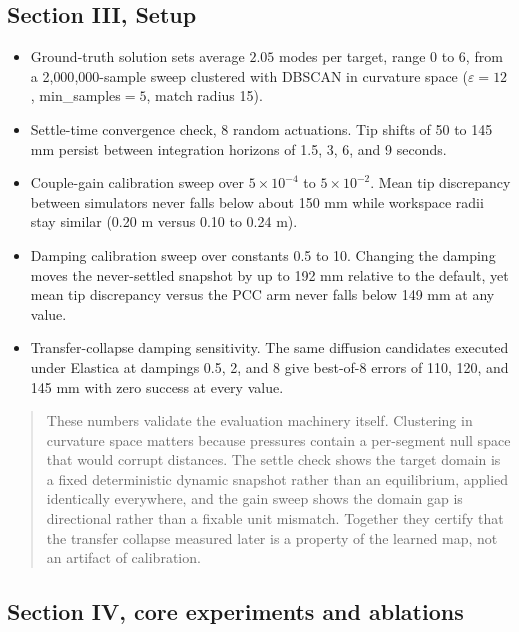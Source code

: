 \documentclass[11pt]{article}
\newcommand{\desc}[1]{\begin{quote}\small #1\end{quote}}
\begin{document}
\subsection*{Section III, Setup}

\begin{itemize}
\item Ground-truth solution sets average $2.05$ modes per target, range 0 to
6, from a 2{,}000{,}000-sample sweep clustered with DBSCAN in curvature
space ($\varepsilon{=}12$, min\_samples${}=5$, match radius 15).
\item Settle-time convergence check, 8 random actuations. Tip shifts of 50
to 145 mm persist between integration horizons of 1.5, 3, 6, and 9 seconds.
\item Couple-gain calibration sweep over $5\times10^{-4}$ to
$5\times10^{-2}$. Mean tip discrepancy between simulators never falls below
about 150 mm while workspace radii stay similar (0.20 m versus 0.10 to 0.24
m).
\item Damping calibration sweep over constants 0.5 to 10. Changing the
damping moves the never-settled snapshot by up to 192 mm relative to the
default, yet mean tip discrepancy versus the PCC arm never falls below 149
mm at any value.
\item Transfer-collapse damping sensitivity. The same diffusion candidates
executed under Elastica at dampings 0.5, 2, and 8 give best-of-8 errors of
110, 120, and 145 mm with zero success at every value.
\end{itemize}

\desc{These numbers validate the evaluation machinery itself. Clustering in
curvature space matters because pressures contain a per-segment null space
that would corrupt distances. The settle check shows the target domain is a
fixed deterministic dynamic snapshot rather than an equilibrium, applied
identically everywhere, and the gain sweep shows the domain gap is
directional rather than a fixable unit mismatch. Together they certify that
the transfer collapse measured later is a property of the learned map, not
an artifact of calibration.}

\subsection*{Section IV, core experiments and ablations}
\end{document}
